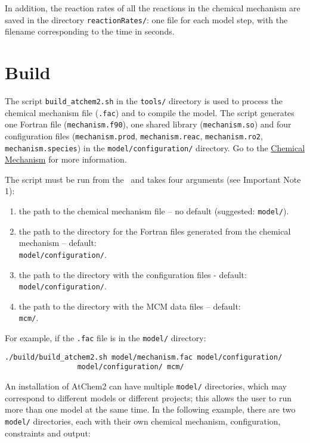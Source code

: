 In addition, the reaction rates of all the reactions in the chemical
mechanism are saved in the directory \texttt{reactionRates/}: one file
for each model step, with the filename corresponding to the time in
seconds.

\section{Build} \label{sec:build}

The script \texttt{build\_atchem2.sh} in the \texttt{tools/} directory is used
to process the chemical mechanism file (\texttt{.fac}) and to compile
the model. The script generates one Fortran file
(\texttt{mechanism.f90}), one shared library (\texttt{mechanism.so})
and four configuration files (\texttt{mechanism.prod},
\texttt{mechanism.reac}, \texttt{mechanism.ro2},
\texttt{mechanism.species}) in the \texttt{model/configuration/}
directory. Go to the \hyperref[sec:chemical-mechanism]{Chemical Mechanism} for
more information.

The script must be run from the \maindir\ and takes four arguments
(see Important Note 1):

\begin{enumerate}
\item the path to the chemical mechanism file -- no default
  (suggested: \texttt{model/}).
\item the path to the directory for the Fortran files generated from
  the chemical mechanism -- default:\\ \texttt{model/configuration/}.
\item the path to the directory with the configuration files -
  default:\\ \texttt{model/configuration/}.
\item the path to the directory with the MCM data files -- default:\\
  \texttt{mcm/}.
\end{enumerate}

For example, if the \texttt{.fac} file is in the \texttt{model/}
directory:

\begin{verbatim}
./build/build_atchem2.sh model/mechanism.fac model/configuration/
                 model/configuration/ mcm/
\end{verbatim}

An installation of AtChem2 can have multiple \texttt{model/}
directories, which may correspond to different models or different
projects; this allows the user to run more than one model at the same
time. In the following example, there are two \texttt{model/}
directories, each with their own chemical mechanism, configuration,
constraints and output:

